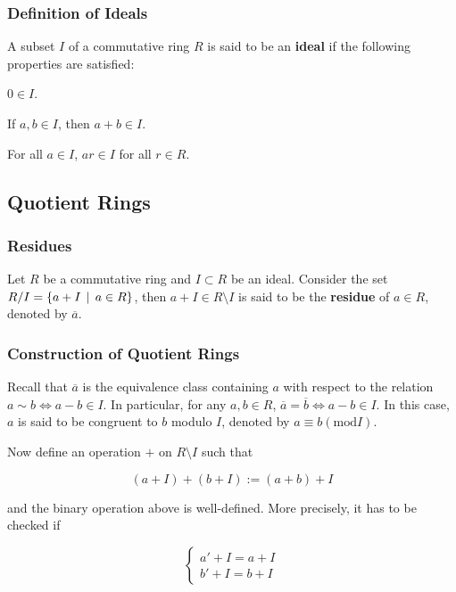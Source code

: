 \documentclass[a4paper,12pt]{article}
\begin{document}
\subsubsection{Definition of Ideals}
\begin{dft}
  A subset $I$ of a commutative ring $R$ is said to be an \textbf{ideal} if the following properties are satisfied:

  \begin{alist}
    \item $0\in I$.
    \item If $a,b\in I$, then $a+b\in I$.
    \item For all $a\in I$, $ar\in I$ for all $r\in R$.
  \end{alist}
\end{dft}

\subsection{Quotient Rings}
\subsubsection{Residues}
\begin{dft}
  Let $R$ be a commutative ring and $I\subset R$ be an ideal. Consider the set $R/I=\left\{ a+I\,\mid\, a\in R\right\}$, then $a+I\in R\setminus I$ is said to be the \textbf{residue} of $a\in R$, denoted by $\overline{a}$.
\end{dft}

\subsubsection{Construction of Quotient Rings}
Recall that $\overline{a}$ is the equivalence class containing $a$ with respect to the relation $a\sim b\Leftrightarrow a-b\in I$. In particular, for any $a,b\in R$, $\overline{a}=\overline{b}\Leftrightarrow a-b\in I$. In this case, $a$ is said to be congruent to $b$ modulo $I$, denoted by $a\equiv b(\mathrm{mod} I)$.\n

Now define an operation $+$ on $R\setminus I$ such that

$$(a+I)+(b+I):=(a+b)+I$$\s

and the binary operation above is well-defined. More precisely, it has to be checked if

$$\begin{cases}
  a'+I=a+I\\
  b'+I=b+I
\end{cases}$$\s
\end{document}

